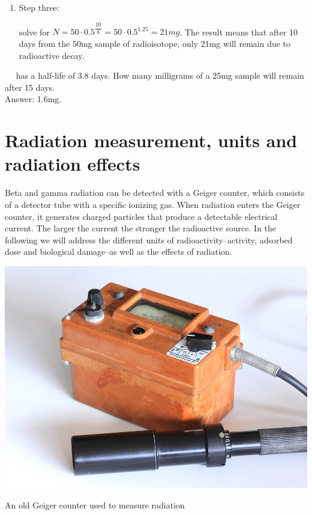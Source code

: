\documentclass[main.tex]{subfiles}
\begin{document}
\begin{example}
\begin{enumerate}[label=\protect\circled{\color{white}\arabic*}]
\begin{tikzpicture}[overlay, remember picture,node distance =1.5cm]
    \end{tikzpicture}\vspace{12mm} %
\item \begin{bf}Step three:\end{bf} solve for $N=50 \cdot 0.5^{\dfrac{10}{8}}=50 \cdot 0.5^{1.25}=21mg$. The result means that after 10 days from the 50mg sample of radioisotope, only 21mg will remain due to radioactive decay.
\end{enumerate}
\faDiamond\ \
 has a half-life of 3.8 days. How many milligrams of a 25mg sample will remain after 15 days.\\
\flushright Answer: 1.6mg.
\end{example}%



\section{Radiation measurement, units and radiation effects}
Beta and gamma radiation can be detected with a  Geiger counter, which consists of a detector tube with a specific ionizing gas. When radiation enters the Geiger counter, it generates charged particles that produce a detectable electrical current. The larger the current the stronger the radioactive source. In the following we will address the different units of radioactivity--activity, adsorbed dose and biological damage--as well as the effects of radiation.
\begin{marginfigure}[-4cm]%
      \includegraphics{../Ch-nuclear/figure2}
      \label{fig:marginfig}
      \caption{An old Geiger counter used to measure radiation}
	\end{marginfigure}%
\end{document}

